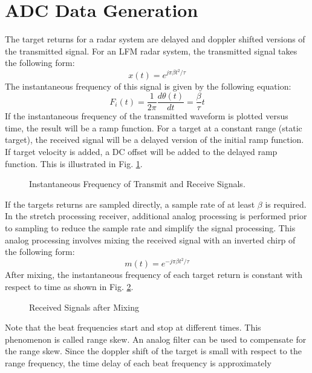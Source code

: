 \documentclass[conference]{IEEEtran}
\begin{document}
\section{ADC Data Generation}
The target returns for a radar system are delayed and doppler shifted versions of the transmitted signal. For an LFM radar system, the transmitted signal takes the following form:
\begin{equation}
x(t) = e^{j\pi\beta t^2/\tau}
\end{equation}
The instantaneous frequency of this signal is given by the following equation:
\begin{equation}
F_i(t) = \frac{1}{2\pi}\frac{d\theta(t)}{dt} = \frac{\beta}{\tau}t
\end{equation}
If the instantaneous frequency of the transmitted waveform is plotted versus time, the result will be a ramp function. For a target at a constant range (static target), the received signal will be a delayed version of the initial ramp function. If target velocity is added, a DC offset will be added to the delayed ramp function. This is illustrated in Fig. \ref{inst_freq}.
\begin{figure}[H]
\centerline{}
\caption{Instantaneous Frequency of Transmit and Receive Signals.}
\label{inst_freq}
\end{figure}
If the targets returns are sampled directly, a sample rate of at least $\beta$ is required. In the stretch processing receiver, additional analog processing is performed prior to sampling to reduce the sample rate and simplify the signal processing. This analog processing involves mixing the received signal with an inverted chirp of the following form:
\begin{equation}
m(t) = e^{-j\pi\beta t^2/\tau}
\end{equation}
After mixing, the instantaneous frequency of each target return is constant with respect to time as shown in Fig. \ref{beat_freq_new}.
\begin{figure}[H]
\centerline{}
\caption{Received Signals after Mixing}
\label{beat_freq_new}
\end{figure}
Note that the beat frequencies start and stop at different times. This phenomenon is called range skew. An analog filter can be used to compensate for the range skew. Since the doppler shift of the target is small with respect to the range frequency, the time delay of each beat frequency is approximately
\end{document}
